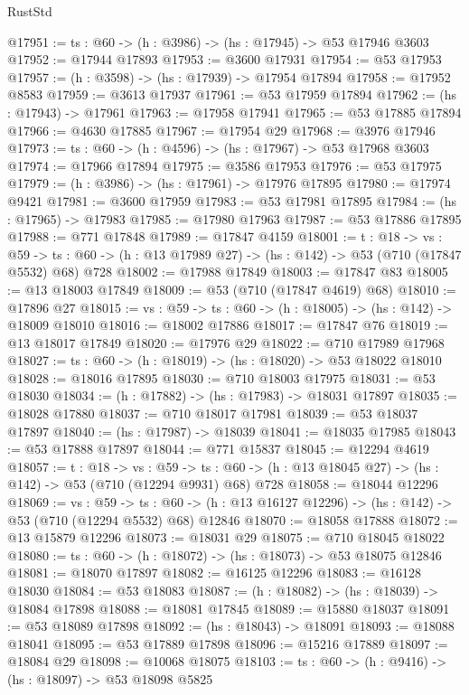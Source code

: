 \begin{lexlean}{RustStd}
\begin{coremodule}
@17951 := {ts : @60} -> (h : @3986) -> (hs : @17945) -> @53 @17946 @3603
@17952 := @17944 @17893
@17953 := @3600 @17931
@17954 := @53 @17953
@17957 := (h : @3598) -> (hs : @17939) -> @17954 @17894
@17958 := @17952 @8583
@17959 := @3613 @17937
@17961 := @53 @17959 @17894
@17962 := (hs : @17943) -> @17961
@17963 := @17958 @17941
@17965 := @53 @17885 @17894
@17966 := @4630 @17885
@17967 := @17954 @29
@17968 := @3976 @17946
@17973 := {ts : @60} -> (h : @4596) -> (hs : @17967) -> @53 @17968 @3603
@17974 := @17966 @17894
@17975 := @3586 @17953
@17976 := @53 @17975
@17979 := (h : @3986) -> (hs : @17961) -> @17976 @17895
@17980 := @17974 @9421
@17981 := @3600 @17959
@17983 := @53 @17981 @17895
@17984 := (hs : @17965) -> @17983
@17985 := @17980 @17963
@17987 := @53 @17886 @17895
@17988 := @771 @17848
@17989 := @17847 @4159
@18001 := {t : @18} ->
  {vs : @59} ->
  {ts : @60} -> (h : @13 @17989 @27) -> (hs : @142) -> @53 (@710 (@17847 @5532) @68) @728
@18002 := @17988 @17849
@18003 := @17847 @83
@18005 := @13 @18003 @17849
@18009 := @53 (@710 (@17847 @4619) @68)
@18010 := @17896 @27
@18015 := {vs : @59} -> {ts : @60} -> (h : @18005) -> (hs : @142) -> @18009 @18010
@18016 := @18002 @17886
@18017 := @17847 @76
@18019 := @13 @18017 @17849
@18020 := @17976 @29
@18022 := @710 @17989 @17968
@18027 := {ts : @60} -> (h : @18019) -> (hs : @18020) -> @53 @18022 @18010
@18028 := @18016 @17895
@18030 := @710 @18003 @17975
@18031 := @53 @18030
@18034 := (h : @17882) -> (hs : @17983) -> @18031 @17897
@18035 := @18028 @17880
@18037 := @710 @18017 @17981
@18039 := @53 @18037 @17897
@18040 := (hs : @17987) -> @18039
@18041 := @18035 @17985
@18043 := @53 @17888 @17897
@18044 := @771 @15837
@18045 := @12294 @4619
@18057 := {t : @18} ->
  {vs : @59} ->
  {ts : @60} -> (h : @13 @18045 @27) -> (hs : @142) -> @53 (@710 (@12294 @9931) @68) @728
@18058 := @18044 @12296
@18069 := {vs : @59} ->
  {ts : @60} -> (h : @13 @16127 @12296) -> (hs : @142) -> @53 (@710 (@12294 @5532) @68) @12846
@18070 := @18058 @17888
@18072 := @13 @15879 @12296
@18073 := @18031 @29
@18075 := @710 @18045 @18022
@18080 := {ts : @60} -> (h : @18072) -> (hs : @18073) -> @53 @18075 @12846
@18081 := @18070 @17897
@18082 := @16125 @12296
@18083 := @16128 @18030
@18084 := @53 @18083
@18087 := (h : @18082) -> (hs : @18039) -> @18084 @17898
@18088 := @18081 @17845
@18089 := @15880 @18037
@18091 := @53 @18089 @17898
@18092 := (hs : @18043) -> @18091
@18093 := @18088 @18041
@18095 := @53 @17889 @17898
@18096 := @15216 @17889
@18097 := @18084 @29
@18098 := @10068 @18075
@18103 := {ts : @60} -> (h : @9416) -> (hs : @18097) -> @53 @18098 @5825

\end{coremodule}
\end{lexlean}
